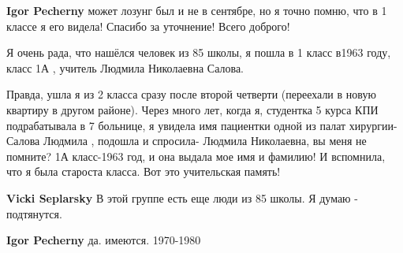 \begin{itemize}
\begin{itemize}
\begin{itemize}
 
\textbf{Igor Pecherny} может лозунг был и не в сентябре, но я точно помню, что
в 1 классе я его видела! Спасибо за уточнение! Всего доброго!
\end{itemize}

\end{itemize}

 

Я очень рада, что нашёлся человек из 85 школы, я пошла в 1 класс в1963 году,
класс 1А , учитель Людмила Николаевна Салова.

Правда, ушла я из 2 класса сразу после второй четверти (переехали в новую
квартиру в другом районе). Через много лет, когда я, студентка 5 курса КПИ
подрабатывала в 7 больнице, я увидела имя пациентки одной из палат хирургии-
Салова Людмила , подошла и спросила- Людмила Николаевна, вы меня не помните? 1А
класс-1963 год, и она выдала мое имя и фамилию! И вспомнила, что я была
староста класса. Вот это учительская память!

\begin{itemize}
 
\textbf{Vicki Seplarsky} В этой группе есть еще люди из 85 школы. Я думаю - подтянутся.

\begin{itemize}
 
\textbf{Igor Pecherny} да. имеются. 1970-1980


 

\end{itemize}
\end{itemize}
\end{itemize}
